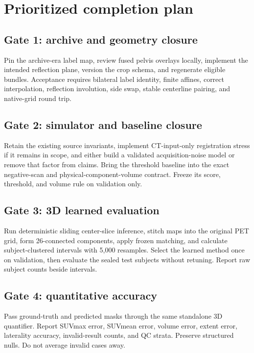 \documentclass[11pt]{article}
\begin{document}
\section{Prioritized completion plan}

\subsection{Gate 1: archive and geometry closure}

Pin the archive-era label map, review fused pelvis overlays locally, implement the intended reflection plane, version the crop schema, and regenerate eligible bundles. Acceptance requires bilateral label identity, finite affines, correct interpolation, reflection involution, side swap, stable centerline pairing, and native-grid round trip.

\subsection{Gate 2: simulator and baseline closure}

Retain the existing source invariants, implement CT-input-only registration stress if it remains in scope, and either build a validated acquisition-noise model or remove that factor from claims. Bring the threshold baseline into the exact negative-scan and physical-component-volume contract. Freeze its score, threshold, and volume rule on validation only.

\subsection{Gate 3: 3D learned evaluation}

Run deterministic sliding center-slice inference, stitch maps into the original PET grid, form 26-connected components, apply frozen matching, and calculate subject-clustered intervals with 5,000 resamples. Select the learned method once on validation, then evaluate the sealed test subjects without retuning. Report raw subject counts beside intervals.

\subsection{Gate 4: quantitative accuracy}

Pass ground-truth and predicted masks through the same standalone 3D quantifier. Report SUVmax error, SUVmean error, volume error, extent error, laterality accuracy, invalid-result counts, and QC strata. Preserve structured nulls. Do not average invalid cases away.
\end{document}
